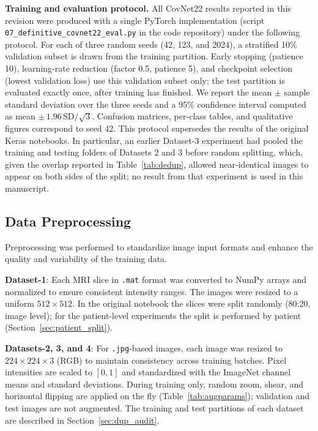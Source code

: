 \documentclass[a4paper,fleqn]{cas-sc}
\begin{document}
\textbf{Training and evaluation protocol.} All CovNet22 results reported in this revision were produced with a single PyTorch implementation (script \texttt{07\_definitive\_covnet22\_eval.py} in the code repository) under the following protocol. For each of three random seeds (42, 123, and 2024), a stratified 10\% validation subset is drawn from the training partition. Early stopping (patience 10), learning-rate reduction (factor 0.5, patience 5), and checkpoint selection (lowest validation loss) use this validation subset only; the test partition is evaluated exactly once, after training has finished. We report the mean $\pm$ sample standard deviation over the three seeds and a 95\% confidence interval computed as mean $\pm\,1.96\,\mathrm{SD}/\sqrt{3}$. Confusion matrices, per-class tables, and qualitative figures correspond to seed 42. This protocol supersedes the results of the original Keras notebooks. In particular, an earlier Dataset-3 experiment had pooled the training and testing folders of Datasets 2 and 3 before random splitting, which, given the overlap reported in Table~\ref{tab:dedup}, allowed near-identical images to appear on both sides of the split; no result from that experiment is used in this manuscript.

\subsection{Data Preprocessing}

Preprocessing was performed to standardize image input formats and enhance the quality and variability of the training data.

\textbf{Dataset-1}: Each MRI slice in \texttt{.mat} format was converted to NumPy arrays and normalized to ensure consistent intensity ranges. The images were resized to a uniform $512 \times 512$. In the original notebook the slices were split randomly (80:20, image level); for the patient-level experiments the split is performed by patient (Section~\ref{sec:patient_split}).

\textbf{Datasets-2, 3, and 4}: For \texttt{.jpg}-based images, each image was resized to $224 \times 224 \times 3$ (RGB) to maintain consistency across training batches. Pixel intensities are scaled to $[0,1]$ and standardized with the ImageNet channel means and standard deviations. During training only, random zoom, shear, and horizontal flipping are applied on the fly (Table~\ref{tab:augparams}); validation and test images are not augmented. The training and test partitions of each dataset are described in Section~\ref{sec:dup_audit}.
\end{document}
